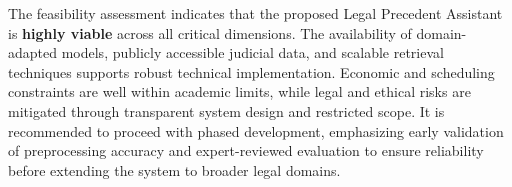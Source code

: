 The feasibility assessment indicates that the proposed Legal Precedent Assistant is \textbf{highly viable} across all critical dimensions. The availability of domain-adapted models, publicly accessible judicial data, and scalable retrieval techniques supports robust technical implementation. Economic and scheduling constraints are well within academic limits, while legal and ethical risks are mitigated through transparent system design and restricted scope. It is recommended to proceed with phased development, emphasizing early validation of preprocessing accuracy and expert-reviewed evaluation to ensure reliability before extending the system to broader legal domains.

